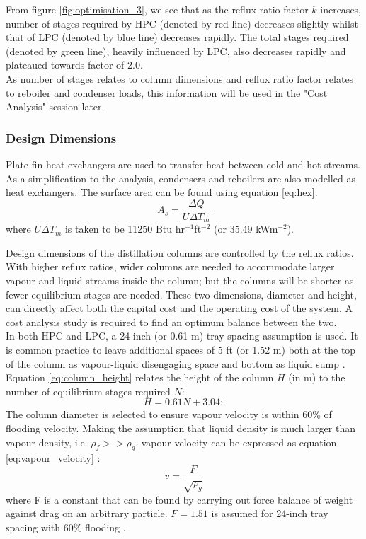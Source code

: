 	\noindent From figure \ref{fig:optimisation_3}, we see that as the reflux ratio factor $k$ increases, number of stages required by HPC (denoted by red line) decreases slightly whilst that of LPC (denoted by blue line) decreases rapidly. The total stages required (denoted by green line), heavily influenced by LPC, also decreases rapidly and plateaued towards factor of 2.0. \\
	As number of stages relates to column dimensions and reflux ratio factor relates to reboiler and condenser loads, this information will be used in the "Cost Analysis" session later.
    \subsubsection{Design Dimensions} \noindent
		Plate-fin heat exchangers are used to transfer heat between cold and hot streams. As a simplification to the analysis, condensers and reboilers are also modelled as heat exchangers. The surface area can be found using equation \ref{eq:hex}.
		\begin{equation}
		    A_s = \frac{\Delta Q}{U\Delta T_m}
		    \label{eq:hex}
		\end{equation} 
		where $U\Delta T_m$ is taken to be 11250 Btu hr$^{-1}$ft$^{-2}$ (or 35.49 kWm$^{-2}$).
		
		Design dimensions of the distillation columns are controlled by the reflux ratios. With higher reflux ratios, wider columns are needed to accommodate larger vapour and liquid streams inside the column; but the columns will be shorter as fewer equilibrium stages are needed. These two dimensions, diameter and height, can directly affect both the capital cost and the operating cost of the system. A cost analysis study is required to find an optimum balance between the two. \\
		
		\noindent In both HPC and LPC, a 24-inch (or 0.61 m) tray spacing assumption is used. It is common practice to leave additional spaces of 5 ft (or 1.52 m) both at the top of the column as vapour-liquid disengaging space and bottom as liquid sump \citep{douglas1988}. Equation \ref{eq:column_height} relates the height of the column $H$ (in m) to the number of equilibrium stages required $N$:
		\begin{equation}
		    H = 0.61N + 3.04;
		    \label{eq:column_height}
		\end{equation}
		The column diameter is selected to ensure vapour velocity is within 60\% of flooding velocity. Making the assumption that liquid density is much larger than vapour density, i.e. $\rho_f >> \rho_g$, vapour velocity can be expressed as equation \ref{eq:vapour_velocity} \citep{douglas1988}:
		\begin{equation}
		    v = \frac{F}{\sqrt{\rho_g}}
		    \label{eq:vapour_velocity}
		\end{equation}
		where F is a constant that can be found by carrying out force balance of weight against drag on an arbitrary particle. $F = 1.51$ is assumed for 24-inch tray spacing with 60\% flooding \citep{perry2007}. \\
		
